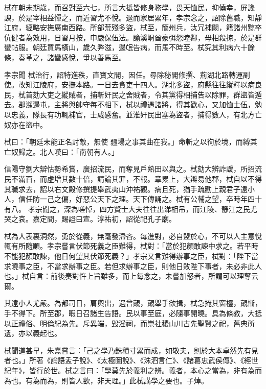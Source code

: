 \begin{pinyinscope}
 栻在朝未期歲，而召對至六七，所言大抵皆修身務學，畏天恤民，抑僥幸，屏讒諛，於是宰相益憚之，而近習尤不悅。退而家居累年，孝宗念之，詔除舊職，知靜江府，經略安撫廣南西路。所部荒殘多盜，栻至，簡州兵，汰冗補闕，籍諸州黥卒伉健者為效用，日習月按，申嚴保伍法。諭溪峒酋豪弭怨睦鄰，毋相殺掠，於是群蠻帖服。朝廷買馬橫山，歲久弊滋，邊氓告病，而馬不時至。栻究其利病六十餘條，奏革之，諸蠻感悅，爭以善馬至。



 孝宗聞
 栻治行，詔特進秩，直寶文閣，因任。尋除秘閣修撰、荊湖北路轉運副使。改知江陵府，安撫本路。一日去貪吏十四人。湖北多盜，府縣往往縱釋以病良民，栻首劾大吏之縱賊者，捕斬奸民之舍賊者，令其黨得相捕告以除罪，群盜皆遁去。郡瀕邊屯，主將與帥守每不相下，栻以禮遇諸將，得其歡心，又加恤士伍，勉以忠義，隊長有功輒補官，士咸感奮。並淮奸民出塞為盜者，捕得數人，有北方亡奴亦在盜中。



 栻曰：「朝廷未能正名討敵，無使
 疆場之事其曲在我。」命斬之以徇於境，而縛其亡奴歸之。北人嘆曰：「南朝有人。」



 信陽守劉大辯怙勢希賞，廣招流民，而奪見戶熟田以與之。栻劾大辨詐諼，所招流民不滿百，而虛增其數十倍，請論其罪，不報。章累上，大辯易他郡，栻自以不得其職求去，詔以右文殿修撰提舉武夷山沖祐觀。病且死，猶手疏勸上親君子遠小人，信任防一己之偏，好惡公天下之理。天下傳誦之。栻有公輔之望，卒時年四十有八。
 孝宗聞之，深為嗟悼，四方賢士大夫往往出涕相吊，而江陵、靜江之民尤哭之哀。嘉定間，賜謚曰宣。淳祐初，詔從祀孔子廟。



 栻為人表裏洞然，勇於從義，無毫發滯吝。每進對，必自盟於心，不可以人主意悅輒有所隨順。孝宗嘗言伏節死義之臣難得，栻對：「當於犯顏敢諫中求之。若平時不能犯顏敢諫，他日何望其伏節死義？」孝宗又言難得辦事之臣，栻對：「陛下當求曉事之臣，不當求辦事之臣。若但求辦事之臣，則他日敗陛下事者，未必非此人也。」栻自言：前後奏對忤上旨雖多，而上每念之，未嘗加怒者，所謂可以理奪云爾。



 其遠小人尤嚴。為都司日，肩輿出，遇曾覿，覿舉手欲揖，栻急掩其窗欞，覿慚，手不得下。所至郡，暇日召諸生告語。民以事至庭，必隨事開曉。具為條教，大抵以正禮俗、明倫紀為先。斥異端，毀淫祠，而崇社稷山川古先聖賢之祀，舊典所遺，亦以義起也。



 栻聞道甚早，朱熹嘗言：「己之學乃銖積寸累而成，如敬夫，則於大本卓然先有見者也。」所著《論語孟子說》、《太極圖說》、《洙泗言仁》、《諸葛忠武侯傳》、《經世紀年》，皆行於世。栻之言曰：「學莫先於義利之辨。義者，本心之當為，非有為而為也。有為而為，則皆人欲，非天理。」此栻講學之要也。子焯。



\end{pinyinscope}